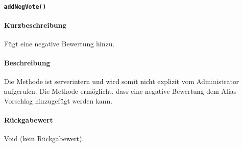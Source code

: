 \paragraph{\texttt{addNegVote()}}%
\paragraph*{Kurzbeschreibung}
Fügt eine negative Bewertung hinzu.
\paragraph*{Beschreibung}
Die Methode ist serverintern und wird somit nicht explizit vom Administrator aufgerufen.
Die Methode ermöglicht, dass eine negative Bewertung dem Alias-Vorschlag hinzugefügt werden kann.
\paragraph*{Rückgabewert}
Void (kein Rückgabewert).

